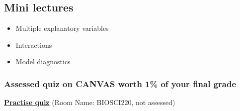 \documentclass{article}
\begin{document}
\subsection*{Mini lectures}

\begin{itemize}
\item Multiple explanatory variables
\item Interactions
\item Model diagnostics
\end{itemize}

\subsubsection*{Assessed quiz on CANVAS worth 1\% of your final grade}
\begin{center}
  \href{https://b.socrative.com/login/student/}{\textbf{\Large Practise quiz}} (Room Name: BIOSCI220, not assessed)
  
\end{center}
\end{document}

